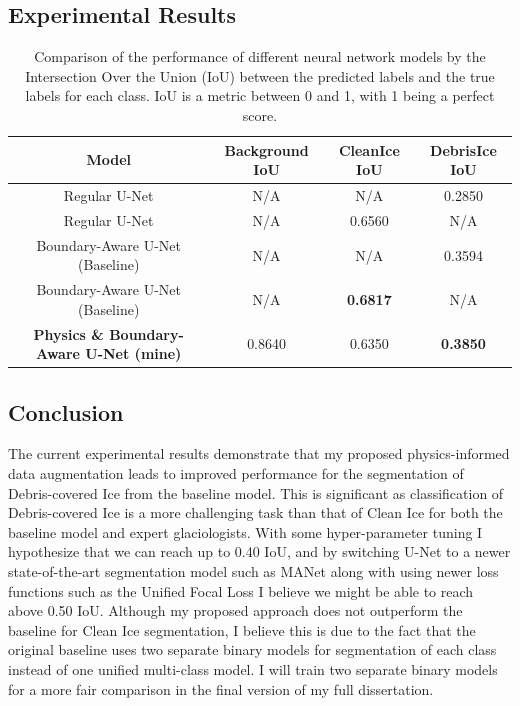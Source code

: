 \subsection{Experimental Results}


\begin{table}[h!]
    \centering
    \begin{tabular}{c|c|c|c}
        Model & Background IoU & CleanIce IoU & DebrisIce IoU \\ \hline
        Regular U-Net & N/A & N/A & 0.2850 \\ \hline
        Regular U-Net & N/A & 0.6560 & N/A \\ \hline
        Boundary-Aware U-Net (Baseline) & N/A & N/A & 0.3594 \\ \hline
        Boundary-Aware U-Net (Baseline) & N/A & \textbf{0.6817} & N/A \\ \hline
        \textbf{Physics \& Boundary-Aware U-Net (mine)} & 0.8640 & 0.6350 & \textbf{0.3850} \\ \hline
        
    \end{tabular}
    \caption{Comparison of the performance of different neural network models by the Intersection Over the Union (IoU) between the predicted labels and the true labels for each class. IoU is a metric between 0 and 1, with 1 being a perfect score.}
    \label{tab:my_label}
\end{table}

\subsection{Conclusion}
The current experimental results demonstrate that my proposed physics-informed data augmentation leads to improved performance for the segmentation of Debris-covered Ice from the baseline model. This is significant as classification of Debris-covered Ice is a more challenging task than that of Clean Ice for both the baseline model and expert glaciologists. With some hyper-parameter tuning I hypothesize that we can reach up to 0.40 IoU, and by switching U-Net to a newer state-of-the-art segmentation model such as MANet \cite{MANet} along with using newer loss functions such as the Unified Focal Loss \cite{UnifiedLoss} I believe we might be able to reach above 0.50 IoU. Although my proposed approach does not outperform the baseline for Clean Ice segmentation, I believe this is due to the fact that the original baseline uses two separate binary models for segmentation of each class instead of one unified multi-class model. I will train two separate binary models for a more fair comparison in the final version of my full dissertation.